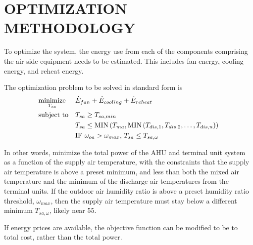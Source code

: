 
%
%
%

\chapter{\texorpdfstring{\MakeUppercase{Optimization Methodology}}{Optimization Methodology}}

To optimize the system, the energy use from each of the components
comprising the air-side equipment needs to be estimated. This includes fan
energy, cooling energy, and reheat energy.

The optimization problem to be solved in standard form is
\begin{equation}
    \begin{aligned}
        & \underset{T_{sa}{}}{\text{minimize}} & & \dot{E}_{fan} + \dot{E}_{cooling} + \dot{E}_{reheat} \\
        & \text{subject to} & & T_{sa}{} \geq T_{sa,min} \\
        &&& T_{sa}{} \leq \text{MIN}\left(T_{ma}, \text{MIN}\left(T_{dis,1}, T_{dis,2}, \ldots, T_{dis,n} \right) \right) \\
        &&& \text{IF } \omega_{oa} > \omega_{max},\,T_{sa}{} \leq T_{sa,\omega}
    \end{aligned}
\end{equation}

In other words, minimize the total power of the AHU and terminal unit
system as a function of the supply air temperature, with the constraints
that the supply air temperature is above a preset minimum, and less than
both the mixed air temperature and the minimum of the discharge air
temperatures from the terminal units. If the outdoor air humidity ratio
is above a preset humidity ratio threshold, \(\omega_{max}\), then the
supply air temperature must stay below a different minimum
\(T_{sa,\omega}\), likely near \SI{55}{\degF}.

If energy prices are available, the objective function can be modified
to be to total cost, rather than the total power.


